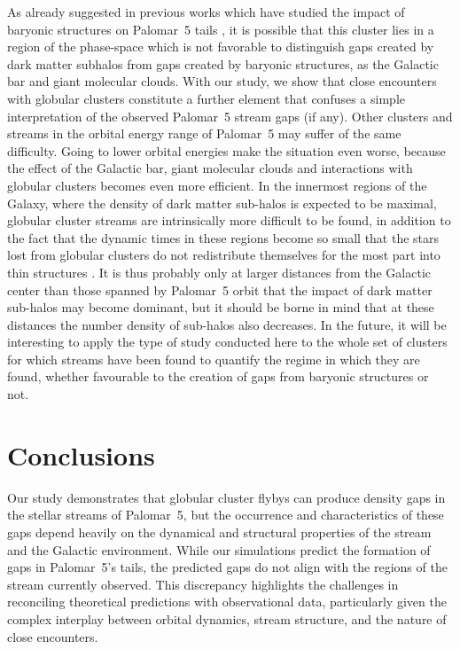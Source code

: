 \documentclass[draft]{aa}
\begin{document}
  As already suggested in previous works which have studied the impact of baryonic structures on Palomar~5 tails \citep{2017NatAs...1..633P, 2019MNRAS.484.2009B}, it is possible that this cluster lies in a region of the phase-space which is not favorable to distinguish gaps created by dark matter subhalos from gaps created by baryonic structures, as the Galactic bar and giant molecular clouds. With our study, we show that close encounters with globular clusters constitute a further element that confuses a simple interpretation of the observed Palomar~5 stream gaps (if any). Other clusters and streams in the orbital energy range of Palomar~5 may suffer of the same difficulty. Going to lower orbital energies make the situation even worse, because the effect of the Galactic bar, giant molecular clouds and interactions with globular clusters becomes even more efficient. In the innermost regions of the Galaxy, where the density of dark matter sub-halos is expected to be maximal, globular cluster streams are intrinsically more difficult to be found, in addition to the fact that the dynamic times in these regions become so small that the stars lost from globular clusters do not redistribute themselves for the most part into thin structures \citep[see][]{2023A&A...673A..44F}. It is thus probably only at larger distances from the Galactic center than those spanned by Palomar~5 orbit that the impact of dark matter sub-halos may become dominant, but it should be borne in mind that at these distances the number density of sub-halos also decreases. In the future, it will be interesting to apply the type of study conducted here to the whole set of clusters for which streams have been found to quantify the regime in which they are found, whether favourable to the creation of gaps from baryonic structures or not.
  

  
\section{Conclusions}
  Our study demonstrates that globular cluster flybys can produce density gaps in the stellar streams of Palomar~5, but the occurrence and characteristics of these gaps depend heavily on the dynamical and structural properties of the stream and the Galactic environment. While our simulations predict the formation of gaps in Palomar~5's tails, the predicted gaps do not align with the regions of the stream currently observed. This discrepancy highlights the challenges in reconciling theoretical predictions with observational data, particularly given the complex interplay between orbital dynamics, stream structure, and the nature of close encounters.
\end{document}
